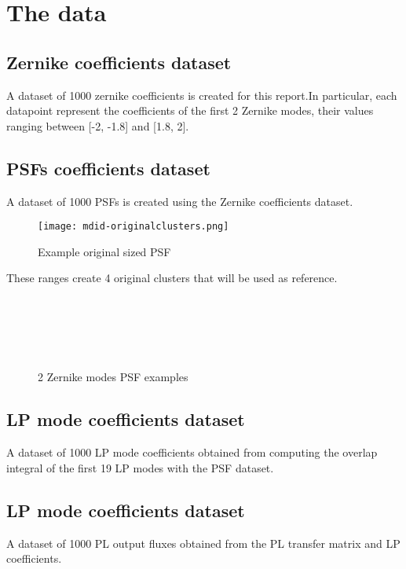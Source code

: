 \section{The data}

	\subsection{Zernike coefficients dataset}
			A dataset of 1000 zernike coefficients is created for this report.In particular, each datapoint represent the coefficients of the first 2 Zernike modes, their values ranging between [-2, -1.8] and [1.8, 2].\\
		
	\subsection{PSFs coefficients dataset}
		
		A dataset of 1000 PSFs is created using the Zernike coefficients dataset.\\
		
		\begin{figure}[ht!]
			\centering
			\texttt{[image: mdid-originalclusters.png]}
			\caption{Example original sized PSF}\hspace{\fill}
		\end{figure}
		
		These ranges create 4 original clusters that will be used as reference.
		
		\begin{figure*}[ht!]
			\centering
			\\
					
			\\
					
			\\
					
			\\
			\caption{2 Zernike modes PSF examples}
		\end{figure*}
		
		\FloatBarrier
		
	\subsection{LP mode coefficients dataset}
		A dataset of 1000 LP mode coefficients obtained from computing the overlap integral of the first 19 LP modes with the PSF dataset.
		
	\subsection{LP mode coefficients dataset}
		A dataset of 1000 PL output fluxes obtained from the PL transfer matrix and LP coefficients.
		